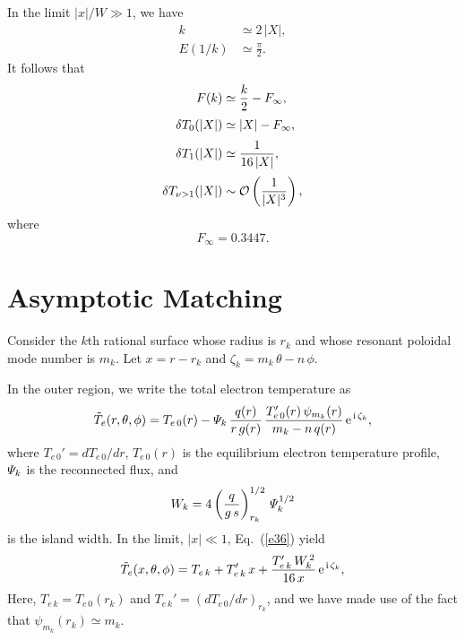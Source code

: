 \documentclass[12pt,prb,aps,notitlepage]{revtex4-1}
\begin{document}
In the limit $|x|/W\gg 1$, we have
\begin{align}
k&\simeq 2\,|X|,\\[0.5ex]
E(1/k) &\simeq \frac{\pi}{2}.
\end{align}
It follows that 
\begin{align}
F(k) &\simeq \frac{k}{2} - F_\infty,\\[0.5ex]
\delta T_0(|X|)&\simeq |X| - F_\infty,\\[0.5ex]
\delta T_1(|X|) &\simeq \frac{1}{16\,|X|},\\[0.5ex]
\delta T_{\nu>1}(|X|)& \sim {\cal O}\left(\frac{1}{|X|^3}\right),
\end{align}
where
\begin{equation}
F_\infty = 0.3447.
\end{equation}

\section{Asymptotic Matching}
Consider the $k$th rational surface whose radius is $r_k$ and whose resonant poloidal mode number is $m_k$. Let  $x=r-r_k$ and $\zeta_k=m_k\,\theta-n\,\phi$. 

 In the outer region,  we write the total electron temperature as 
\begin{equation}\label{e36}
\tilde{T}_e(r, \theta,\phi)=T_{e\,0}(r) - {\mit\Psi}_k\,\frac{q(r)}{r\,g(r)}\,\frac{T_{e\,0}'(r)\,\psi_{m_k}(r)}{m_k-n\,q(r)}\,{\rm e}^{\,{\rm i}\,\zeta_k},
\end{equation}
where $T_{e\,0}'=dT_{e\,0}/dr$, $T_{e\,0}(r)$ is the equilibrium electron temperature profile, ${\mit\Psi}_k$ is the reconnected flux, and 
\begin{equation}
W_k = 4\left(\frac{q}{g\,s}\right)^{1/2}_{r_k}\,{\mit\Psi}_k^{1/2}
\end{equation}
is the island width.
 In the limit, $|x|\ll 1$, Eq.~(\ref{e36}) yield 
\begin{equation}
\tilde{T}_e(x, \theta,\phi)=T_{e\,k} + T_{e\,k}'\,x + \frac{T_{e\,k}'\,W_k^{\,2}}{16\,x}\,{\rm e}^{\,{\rm i}\,\zeta_k},
\end{equation}
Here, $T_{e\,k}=T_{e\,0}(r_k)$ and $T_{e\,k}'= (dT_{e\,0}/dr)_{r_k}$, and we have made use of the fact that $\psi_{m_k}(r_k)\simeq m_k$. 
\end{document}
